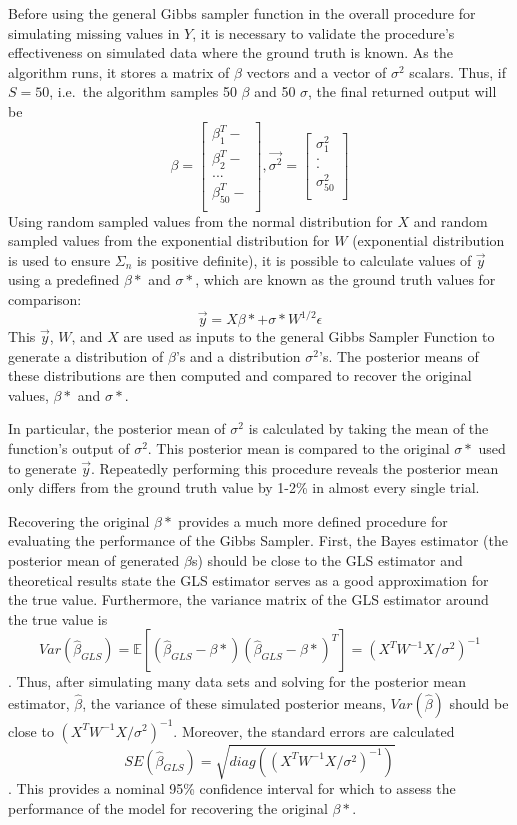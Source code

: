 \documentclass[12pt,twoside]{dukestatscithesis}
\theoremstyle{definition}
\theoremstyle{definition}
\theoremstyle{definition}
\theoremstyle{remark}
\begin{document}
Before using the general Gibbs sampler function in the overall procedure
for simulating missing values in \(Y\), it is necessary to validate the
procedure's effectiveness on simulated data where the ground truth is
known. As the algorithm runs, it stores a matrix of \(\beta\) vectors
and a vector of \(\sigma^2\) scalars. Thus, if \(S = 50\), i.e.~the
algorithm samples 50 \(\beta\) and 50 \(\sigma\), the final returned
output will be \[\beta =
  \begin{bmatrix}
    \beta_1^T- \\
    \beta_2^T- \\
    ... \\
    \beta_{50}^T- \\
  \end{bmatrix},
  \vec{\sigma^2} =
  \begin{bmatrix}
    \sigma_1^2 \\
    . \\
    . \\
    \sigma_{50}^2\\
  \end{bmatrix}\]
Using random sampled values from the normal distribution for \(X\) and
random sampled values from the exponential distribution for \(W\)
(exponential distribution is used to ensure \(\Sigma_n\) is positive
definite), it is possible to calculate values of \(\vec{y}\) using a
predefined \(\beta*\) and \(\sigma *\), which are known as the ground
truth values for comparison:
\[\vec{y} = X\beta * + \sigma * W^{1/2}\epsilon\] This \(\vec{y}\),
\(W\), and \(X\) are used as inputs to the general Gibbs Sampler
Function to generate a distribution of \(\beta\)'s and a distribution
\(\sigma^2\)'s. The posterior means of these distributions are then
computed and compared to recover the original values, \(\beta *\) and
\(\sigma *\).

In particular, the posterior mean of \(\sigma^2\) is calculated by
taking the mean of the function's output of \(\sigma^2\). This posterior
mean is compared to the original \(\sigma *\) used to generate
\(\vec{y}\). Repeatedly performing this procedure reveals the posterior
mean only differs from the ground truth value by 1-2\% in almost every
single trial.

Recovering the original \(\beta *\) provides a much more defined
procedure for evaluating the performance of the Gibbs Sampler. First,
the Bayes estimator (the posterior mean of generated \(\beta\)s) should
be close to the GLS estimator and theoretical results state the GLS
estimator serves as a good approximation for the true value.
Furthermore, the variance matrix of the GLS estimator around the true
value is
\[Var(\hat{\beta}_{GLS}) = \mathbb{E}[(\hat{\beta}_{GLS}-\beta * )(\hat{\beta}_{GLS}-\beta *)^T]=(X^T W^{-1}X/\sigma^2 )^{-1}\].
Thus, after simulating many data sets and solving for the posterior mean
estimator, \(\hat{\beta}\), the variance of these simulated posterior
means, \(Var(\hat{\beta})\) should be close to
\((X^T W^{-1}X/\sigma^2 )^{-1}\). Moreover, the standard errors are
calculated
\[SE(\hat{\beta}_{GLS}) = \sqrt{diag((X^T W^{-1}X/\sigma^2 )^{-1})}\].
This provides a nominal 95\% confidence interval for which to assess the
performance of the model for recovering the original \(\beta *\).
\end{document}
